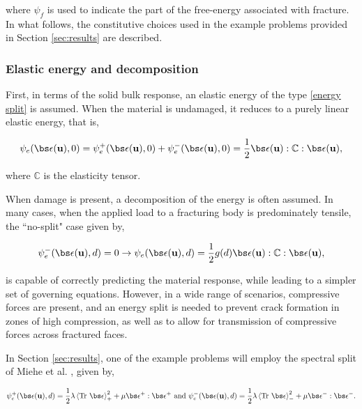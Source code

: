 \noindent where $\psi_f$ is used to indicate the part of the free-energy associated with fracture. In what follows, the constitutive choices used in the example problems provided in Section \ref{sec:results} are described. 

\subsubsection{Elastic energy and decomposition}

First, in terms of the solid bulk response, an elastic energy of the type \eqref{energy split} is assumed. When the material is undamaged, it reduces to a purely linear elastic energy, that is,

\begin{equation}
    \psi_e(\bs\epsilon(\textbf{u}),0) = \psi_e^+(\bs\epsilon(\textbf{u}),0)+\psi_e^-(\bs\epsilon(\textbf{u}),0) = \dfrac{1}{2}\bs\epsilon(\textbf{u}) : \mathbb{C} : \bs\epsilon(\textbf{u}),
\end{equation}

\noindent where $\mathbb{C}$ is the elasticity tensor.

When damage is present, a decomposition of the energy is often assumed. In many cases, when the applied load to a fracturing body is predominately tensile, the ``no-split" case given by,

\begin{equation}
    \psi_e^-(\bs\epsilon(\textbf{u}),d)=0 \rightarrow \psi_e(\bs\epsilon(\textbf{u}),d) = \dfrac{1}{2}g(d)\bs\epsilon(\textbf{u}) : \mathbb{C} : \bs\epsilon(\textbf{u}),
\end{equation}

\noindent is capable of correctly predicting the material response, while leading to a simpler set of governing equations. However, in a wide range of scenarios, compressive forces are present, and an energy split is needed to prevent crack formation in zones of high compression, as well as to allow for transmission of compressive forces across fractured faces. 

In Section \ref{sec:results}, one of the example problems will employ the spectral split of Miehe et al. \cite{miehe2010phase},  given by,

\begin{equation}
    \psi_e^+(\bs\epsilon(\textbf{u}),d) = \dfrac{1}{2}\lambda\left<\text{Tr }\bs\epsilon\right>_+^2+\mu\bs\epsilon^+:\bs\epsilon^+ \text{ and }  \psi_e^-(\bs\epsilon(\textbf{u}),d) = \dfrac{1}{2}\lambda\left<\text{Tr }\bs\epsilon\right>_-^2+\mu\bs\epsilon^-:\bs\epsilon^-.
\end{equation}

